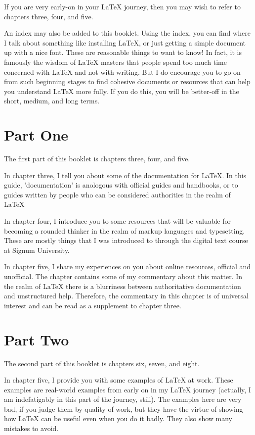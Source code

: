 \documentclass[11pt, oneside]{memoir}
\begin{document}
If you are very early-on in your LaTeX journey, then you may wish to refer to chapters three, four, and five.

An index may also be added to this booklet. Using the index, you can find where I talk about something like installing LaTeX, or just getting a simple document up with a nice font. These are reasonable things to want to know! In fact, it is famously the wisdom of LaTeX masters that people spend too much time concerned with LaTeX and not with writing. But I do encourage you to go on from such beginning stages to find cohesive documents or resources that can help you understand LaTeX more fully. If you do this, you will be better-off in the short, medium, and long terms.

\section{Part One}
The first part of this booklet is chapters three, four, and five.

In chapter three, I tell you about some of the documentation for \LaTeX{}. In this guide, 'documentation' is anologous with official guides and handbooks, or to guides written by people who can be considered authorities in the realm of \LaTeX{}

In chapter four, I introduce you to some resources that will be valuable for becoming a rounded thinker in the realm of markup languages and typesetting. These are mostly things that I was introduced to through the digital text course at Signum University.

In chapter five, I share my experiences on you about online resources, official and unofficial. The chapter contains some of my commentary about this matter. In the realm of \LaTeX{} there is a blurriness between authoritative documentation and unstructured help. Therefore, the commentary in this chapter is of universal interest and can be read as a supplement to chapter three.

\section{Part Two}
The second part of this booklet is chapters six, seven, and eight.

In chapter five, I provide you with some examples of \LaTeX{} at work. These examples are real-world examples from early on in my \LaTeX{} journey (actually, I am indefatigably in this part of the journey, still). The examples here are very bad, if you judge them by quality of work, but they have the virtue of showing how \LaTeX{} can be useful even when you do it badly. They also show many mistakes to avoid.
\end{document}
